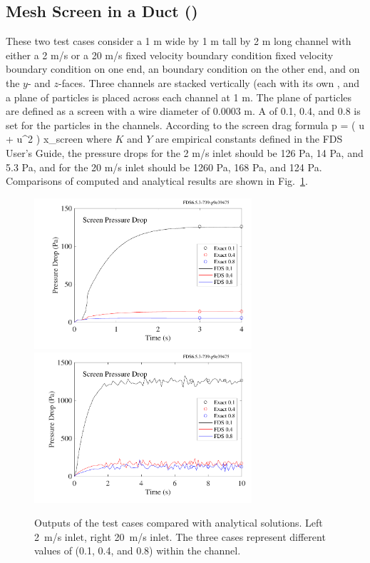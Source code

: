 \documentclass[11pt]{book}
\begin{document}
\subsection{Mesh Screen in a Duct (\texorpdfstring{}{screen\_drag})}
\label{screen_drag_1}
\label{screen_drag_2}

These two test cases consider a 1 m wide by 1 m tall by 2 m long channel with either a 2 m/s or a 20 m/s fixed velocity boundary condition fixed velocity boundary condition on one end, an  boundary condition on the other end, and  on the $y$- and $z$-faces.  Three channels are stacked vertically (each with its own , and a plane of particles is placed across each channel at 1 m.  The plane of particles are defined as a screen with a wire diameter of 0.0003 m.  A  of 0.1, 0.4, and 0.8 is set for the particles in the channels.  According to the screen drag formula
\be
   \Delta p \;= \; \left(  u \; + \; \rho {} u^2 \right) \Delta x_{\rm screen}
\ee
where $K$ and $Y$ are empirical constants defined in the FDS User's Guide, the pressure drops for the 2 m/s inlet should be 126 Pa, 14 Pa, and 5.3 Pa, and for the 20 m/s inlet should be 1260 Pa, 168 Pa, and 124 Pa.   Comparisons of computed and analytical results are shown in Fig.~\ref{screen_drag_plots}.

\begin{figure}[ht]
\includegraphics[height=2.2in]{SCRIPT_FIGURES/screen_drag_1}
\includegraphics[height=2.2in]{SCRIPT_FIGURES/screen_drag_2}
\caption[Sample cases ]{Outputs of the  test cases compared with analytical solutions.  Left 2~m/s inlet, right 20~m/s inlet.  The three cases represent different values of  (0.1, 0.4, and 0.8) within the channel.}
\label{screen_drag_plots}
\end{figure}
\end{document}
